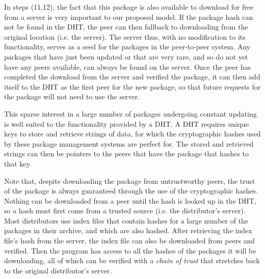 \documentclass[conference]{IEEEtran}
\begin{document}
In steps (11,12), the fact that this package is also available to download for free
from a server is very important to our proposed model. If the package hash
can not be found in the DHT, the peer can then fallback to
downloading from the original location (i.e. the server).
The server thus, with no modification to its
functionality, serves as a seed for the packages in the peer-to-peer
system. Any packages that have just been updated or that are very
rare, and so do not yet have any peers available, can always be found on
the server. Once the peer has completed the download from the server
and verified the package, it can then add itself to the DHT as the
first peer for the new package, so that future requests for the package
will not need to use the server.

This sparse
interest in a large number of packages undergoing constant updating
is well suited to the functionality provided by a DHT. A DHT requires unique keys to store and retrieve strings
of data, for which the cryptographic hashes used by these package
management systems are perfect for. The stored and retrieved strings
can then be pointers to the peers that have the package that hashes
to that key.

Note that, despite downloading the package from untrustworthy peers,
the trust of the package is always guaranteed through the use
of the cryptographic hashes. Nothing can be downloaded from a peer
until the hash is looked up in the DHT, so a hash must first come
from a trusted source (i.e. the distributor's server). Most distributors use index
files that contain hashes for a large number of the packages in
their archive, and which are also hashed. After retrieving the
index file's hash from the server, the index file can also be downloaded from
peers and verified. Then the program has access to all the hashes of
the packages it will be downloading, all of which can be verified
with a \emph{chain of trust} that stretches back to the original
distributor's server.
\end{document}
